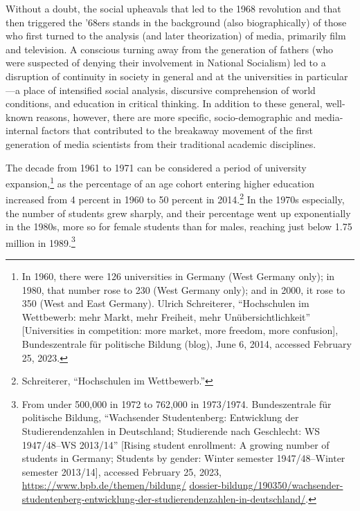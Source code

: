 \documentclass{tufte-handout}
\begin{document}
Without a doubt, the social upheavals that led to the 1968 revolution
and that then triggered the '68ers stands in the background (also
biographically) of those who first turned to the analysis (and later
theorization) of media, primarily film and television. A conscious
turning away from the generation of fathers (who were suspected of
denying their involvement in National Socialism) led to a disruption of
continuity in society in general and at the universities in
particular---a place of intensified social analysis, discursive
comprehension of world conditions, and education in critical thinking.
In addition to these general, well-known reasons, however, there are
more specific, socio-demographic and media-internal factors that
contributed to the breakaway movement of the first generation of media
scientists from their traditional academic disciplines.

The decade from 1961 to 1971 can be considered a period of university
expansion,\footnote{In 1960, there were 126 universities in Germany
  (West Germany only); in 1980, that number rose to 230 (West Germany
  only); and in 2000, it rose to 350 (West and East Germany). Ulrich
  Schreiterer, ``Hochschulen im Wettbewerb: mehr Markt, mehr Freiheit,
  mehr Unübersichtlichkeit'' {[}Universities in competition: more
  market, more freedom, more confusion{]}, Bundeszentrale für politische
  Bildung (blog), June 6, 2014, accessed February 25, 2023.} as the
percentage of an age cohort entering higher education increased from 4
percent in 1960 to 50 percent in 2014.\footnote{Schreiterer,
  ``Hochschulen im Wettbewerb.''} In the 1970s especially, the number of
students grew sharply, and their percentage went up exponentially in the
1980s, more so for female students than for males, reaching just below
1.75 million in 1989.\footnote{From under 500,000 in 1972 to 762,000 in
  1973/1974. Bundeszentrale für politische Bildung, ``Wachsender
  Studentenberg: Entwicklung der Studierendenzahlen in Deutschland;
  Studierende nach Geschlecht: WS 1947/48--WS 2013/14'' {[}Rising
  student enrollment: A growing number of students in Germany; Students
  by gender: Winter semester 1947/48--Winter semester 2013/14{]},
  accessed February 25, 2023,
  \href{https://www.bpb.de/themen/bildung/dossier-bildung/190350/wachsender-studentenberg-entwicklung-der-studierendenzahlen-in-deutschland/}{https://www.bpb.de/themen/bildung/} \href{https://www.bpb.de/themen/bildung/dossier-bildung/190350/wachsender-studentenberg-entwicklung-der-studierendenzahlen-in-deutschland/}{dossier-bildung/190350/wachsender-studentenberg-entwicklung-der-studierendenzahlen-in-deutschland/}.}
\end{document}
